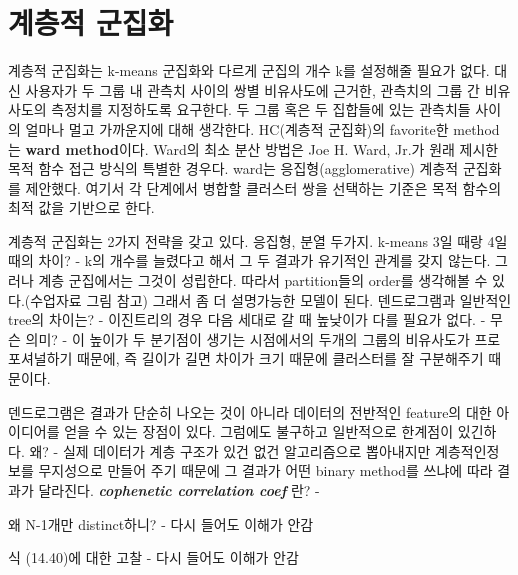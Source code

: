\section{계층적 군집화}
계층적 군집화는 k-means 군집화와 다르게 군집의 개수 k를 설정해줄 필요가 없다. 대신 사용자가 두 그룹 내 관측치 사이의 쌍별 비유사도에 근거한, 관측치의 그룹 간 비유사도의 측정치를 지정하도록 요구한다. 두 그룹 혹은 두 집합들에 있는 관측치들 사이의 얼마나 멀고 가까운지에 대해 생각한다. HC(계층적 군집화)의 favorite한 method는 \textbf{ward method}이다. Ward의 최소 분산 방법은 Joe H. Ward, Jr.가 원래 제시한 목적 함수 접근 방식의 특별한 경우다. ward는 응집형(agglomerative) 계층적 군집화를 제안했다. 여기서 각 단계에서 병합할 클러스터 쌍을 선택하는 기준은 목적 함수의 최적 값을 기반으로 한다.  

계층적 군집화는 2가지 전략을 갖고 있다. 응집형, 분열 두가지.
k-means 3일 때랑 4일 때의 차이? - k의 개수를 늘렸다고 해서 그 두 결과가 유기적인 관계를 갖지 않는다. 그러나 계층 군집에서는 그것이 성립한다. 따라서 partition들의 order를 생각해볼 수 있다.(수업자료 그림 참고) 그래서 좀 더 설명가능한 모델이 된다. 덴드로그램과 일반적인 tree의 차이는? - 이진트리의 경우 다음 세대로 갈 때 높낮이가 다를 필요가 없다. - 무슨 의미? - 이 높이가 두 분기점이 생기는 시점에서의 두개의 그룹의 비유사도가 프로포셔널하기 때문에, 즉 길이가 길면 차이가 크기 때문에 클러스터를 잘 구분해주기 때문이다.

덴드로그램은 결과가 단순히 나오는 것이 아니라 데이터의 전반적인 feature의 대한 아이디어를 얻을 수 있는 장점이 있다. 그럼에도 불구하고 일반적으로 한계점이 있긴하다. 왜? - 실제 데이터가 계층 구조가 있건 없건 알고리즘으로 뽑아내지만 계층적인정보를 무지성으로 만들어 주기 때문에 그 결과가 어떤 binary method를 쓰냐에 따라 결과가 달라진다. \textbf{\textit{cophenetic correlation coef}} 란? - 


왜 N-1개만 distinct하니? - 다시 들어도 이해가 안감

식 (14.40)에 대한 고찰 - 다시 들어도 이해가 안감
